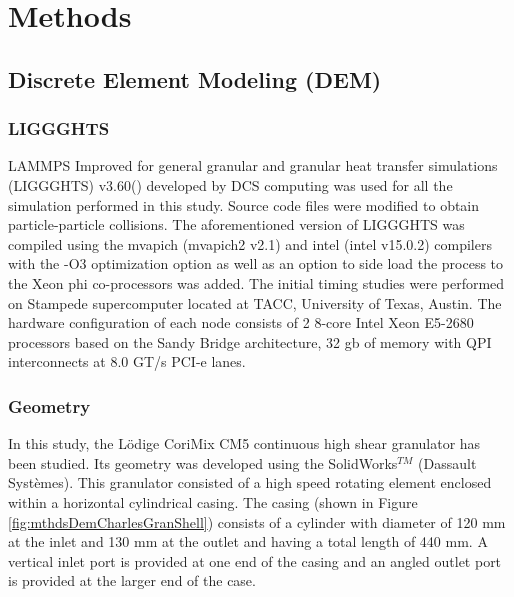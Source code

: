\documentclass[preprint,11pt,authoryear]{elsarticle}
\begin{document}
\section{Methods}

\subsection{Discrete Element Modeling (DEM)}
\subsubsection{LIGGGHTS}
LAMMPS Improved for general granular and granular heat transfer simulations (LIGGGHTS) v3.60(\cite{Kloss2012}) developed by DCS computing was used for all the simulation performed 
in this study. Source code files were modified to obtain particle-particle 
collisions. The aforementioned version of LIGGGHTS was compiled using the mvapich (mvapich2 v2.1) 
and intel (intel v15.0.2) compilers with the -O3 optimization option as well as an option to side load the 
process to the Xeon phi co-processors was added. The initial timing studies were performed on Stampede 
supercomputer located at TACC, University of Texas, Austin. The hardware configuration of each node 
consists of 2 8-core Intel Xeon E5-2680 processors based on the Sandy Bridge architecture, 32 gb of 
memory with QPI interconnects at 8.0 GT/s PCI-e lanes.


\subsubsection{Geometry}    

 In this study, the L\"{o}dige CoriMix CM5 continuous high shear granulator has been studied. Its 
geometry was developed using the SolidWorks$^{TM}$ (Dassault Syst\`{e}mes). This granulator 
consisted of a high speed rotating element enclosed within a horizontal cylindrical casing. The casing 
(shown in Figure \ref{fig:mthdsDemCharlesGranShell}) consists of a cylinder with diameter of 120 mm 
at the inlet and 130 mm at the outlet and having a total length of 440 mm. A vertical inlet port is 
provided at one end of the casing and an angled outlet port is provided at the larger end of the case. 
\end{document}
